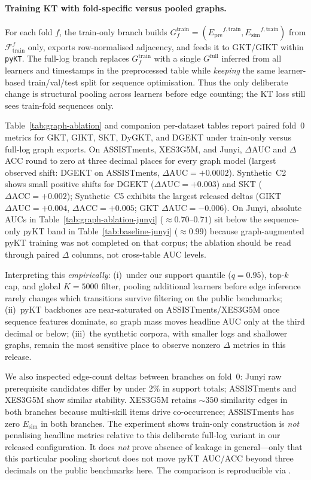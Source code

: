\documentclass[pdflatex,sn-basic]{sn-jnl}
\newcommand{\Epre}{\ensuremath{E_{\text{pre}}}}
\newcommand{\Esim}{\ensuremath{E_{\text{sim}}}}
\begin{document}
\paragraph{Training KT with fold-specific versus pooled graphs.}
For each fold $f$, the train-only branch builds
$G_f^{\text{train}}=(\Epre^{f,\text{train}},\Esim^{f,\text{train}})$ from
$\mathcal{F}_{\text{train}}^f$ only, exports row-normalised adjacency, and
feeds it to GKT/GIKT within \texttt{pyKT}. The full-log branch replaces
$G_f^{\text{train}}$ with a single $G^{\text{full}}$ inferred from all
learners and timestamps in the preprocessed table while \emph{keeping} the
same learner-based train/val/test split for sequence optimisation. Thus the
only deliberate change is structural pooling across learners before edge
counting; the KT loss still sees train-fold sequences only.


Table~\ref{tab:graph-ablation} and companion per-dataset tables report
paired fold~0 metrics for GKT, GIKT, SKT, DyGKT, and DGEKT under
train-only versus full-log graph exports. On ASSISTments, XES3G5M, and
Junyi, $\Delta$AUC and $\Delta$ACC round to zero at three decimal places
for every graph model (largest observed shift: DGEKT on ASSISTments,
$\Delta\text{AUC}{=}{+}0.0002$). Synthetic~C2 shows small positive
shifts for DGEKT ($\Delta\text{AUC}{=}{+}0.003$) and SKT
($\Delta\text{ACC}{=}{+}0.002$); Synthetic~C5 exhibits the largest
released deltas (GIKT $\Delta\text{AUC}{=}{+}0.004$,
$\Delta\text{ACC}{=}{+}0.005$; GKT $\Delta\text{AUC}{=}{-}0.006$).
On Junyi, absolute AUCs in Table~\ref{tab:graph-ablation-junyi}
($\approx 0.70$--$0.71$) sit below the sequence-only pyKT band in
Table~\ref{tab:baseline-junyi} ($\approx 0.99$) because graph-augmented
pyKT training was not completed on that corpus; the ablation should be
read through paired $\Delta$ columns, not cross-table AUC levels.

Interpreting this \emph{empirically}: (i)~under our support quantile
($q{=}0.95$), top-$k$ cap, and global $K{=}5000$ filter, pooling
additional learners before edge inference rarely changes which
transitions survive filtering on the public benchmarks; (ii)~pyKT
backbones are near-saturated on ASSISTments/XES3G5M once sequence
features dominate, so graph mass moves headline AUC only at the third
decimal or below; (iii)~the synthetic corpora, with smaller logs and
shallower graphs, remain the most sensitive place to observe nonzero
$\Delta$ metrics in this release.

We also inspected edge-count deltas between branches on fold~0:
Junyi raw prerequisite candidates differ by under $2\%$ in support
totals; ASSISTments and XES3G5M show similar stability. XES3G5M retains
${\sim}350$ similarity edges in both branches because multi-skill items
drive co-occurrence; ASSISTments has zero $\Esim$ in both branches.
The experiment shows train-only construction is \emph{not} penalising
headline metrics relative to this deliberate full-log variant in our
released configuration. It does \emph{not} prove absence of leakage in
general---only that this particular pooling shortcut does not move pyKT
AUC/ACC beyond three decimals on the public benchmarks here. The
comparison is reproducible via
.
\end{document}
